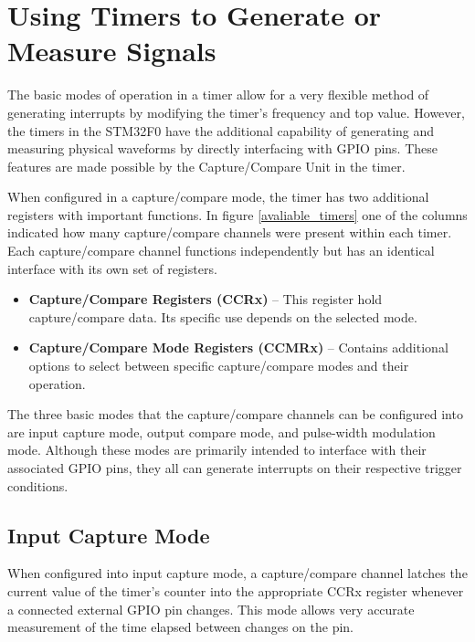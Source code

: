 \documentclass[11pt,fleqn]{book} %
\begin{document}
    

\section{Using Timers to Generate or Measure Signals}
The basic modes of operation in a timer allow for a very flexible method of generating interrupts by modifying the timer's frequency and top value. However, the timers in the STM32F0 have the additional capability of generating and measuring physical waveforms by directly interfacing with GPIO pins. These features are made possible by the Capture/Compare Unit in the timer. 

When configured in a capture/compare mode, the timer has two additional registers with important functions.  In figure \ref{avaliable_timers} one of the columns indicated how many capture/compare channels were present within each timer. Each capture/compare channel functions independently but has an identical interface with its own set of registers.  
\begin{itemize}
    \item \textbf{Capture/Compare Registers (CCRx)} -- This register hold capture/compare data. Its specific use depends on the selected mode.
    \item \textbf{Capture/Compare Mode Registers (CCMRx)} -- Contains additional options to select between specific capture/compare modes and their operation.
\end{itemize}

The three basic modes that the capture/compare channels can be configured into are input capture mode, output compare mode, and pulse-width modulation mode. Although these modes are primarily intended to interface with their associated GPIO pins, they all can generate interrupts on their respective trigger conditions. 

%    
    
    \subsection{Input Capture Mode}
    When configured into input capture mode, a capture/compare channel latches the current value of the timer's counter into the appropriate CCRx register whenever a connected external GPIO pin changes. This mode allows very accurate measurement of the time elapsed between changes on the pin. 
    
\end{document}

